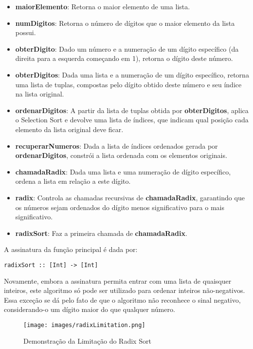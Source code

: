 \documentclass[12pt,a4paper]{article}
\begin{document}
\begin{itemize}
\item \textbf{maiorElemento}: Retorna o maior elemento de uma lista. 
\item \textbf{numDigitos}: Retorna o número de dígitos que o maior elemento da lista possui.
\item \textbf{obterDigito}: Dado um número e a numeração de um dígito específico (da direita para a esquerda começando em 1), retorna o dígito deste número.
\item \textbf{obterDigitos}: Dada uma lista e a numeração de um dígito específico, retorna uma lista de tuplas, compostas pelo dígito obtido deste número e seu índice na lista original.
\item \textbf{ordenarDigitos}: A partir da lista de tuplas obtida por \textbf{obterDigitos}, aplica o Selection Sort e devolve uma lista de índices, que indicam qual posição cada elemento da lista original deve ficar.
\item \textbf{recuperarNumeros}: Dada a lista de índices ordenados gerada por \textbf{ordenarDigitos}, constrói a lista ordenada com os elementos originais.
\item \textbf{chamadaRadix}: Dada uma lista e uma numeração de dígito específico, ordena a lista em relação a este dígito.
\item \textbf{radix}: Controla as chamadas recursivas de \textbf{chamadaRadix}, garantindo que os números sejam ordenados do dígito menos significativo para o mais significativo.
\item \textbf{radixSort}: Faz a primeira chamada de \textbf{chamadaRadix}.
\end{itemize}

A assinatura da função principal é dada por:

\begin{lstlisting}
radixSort :: [Int] -> [Int]
\end{lstlisting}

Novamente, embora a assinatura permita entrar com uma lista de quaisquer inteiros, este algoritmo só pode ser utilizado para ordenar inteiros não-negativos. Essa exceção se dá pelo fato de que o algoritmo não reconhece o sinal negativo, considerando-o um dígito maior do que qualquer número.

\begin{figure}[h]
	\centering
	\texttt{[image: images/radixLimitation.png]}
	\caption{Demonstração da Limitação do Radix Sort}
\end{figure}
\end{document}
